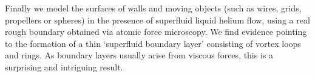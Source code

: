 Finally we model the surfaces of walls and moving objects (such as wires, grids, propellers or spheres) in the presence of superfluid liquid helium flow, using a real rough boundary obtained via atomic force microscopy. We find evidence pointing to the formation of a thin `superfluid boundary layer' consisting of 
vortex loops and rings. As boundary layers usually arise from viscous forces, this is a surprising and intriguing result.
\thispagestyle{empty}
\cleardoublepage
